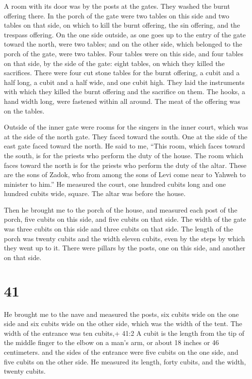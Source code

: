  A room with its door was by the posts at the gates. They
washed the burnt offering there.  In the porch of the gate
were two tables on this side and two tables on that side, on which to
kill the burnt offering, the sin offering, and the trespass offering.
 On the one side outside, as one goes up to the entry of
the gate toward the north, were two tables; and on the other side, which
belonged to the porch of the gate, were two tables.  Four
tables were on this side, and four tables on that side, by the side of
the gate: eight tables, on which they killed the sacrifices.
 There were four cut stone tables for the burnt offering, a
cubit and a half long, a cubit and a half wide, and one cubit high. They
laid the instruments with which they killed the burnt offering and the
sacrifice on them.  The hooks, a hand width long, were
fastened within all around. The meat of the offering was on the tables.

 Outside of the inner gate were rooms for the singers in
the inner court, which was at the side of the north gate. They faced
toward the south. One at the side of the east gate faced toward the
north.  He said to me, ``This room, which faces toward the
south, is for the priests who perform the duty of the house.
 The room which faces toward the north is for the priests
who perform the duty of the altar. These are the sons of Zadok, who from
among the sons of Levi come near to Yahweh to minister to him.''
 He measured the court, one hundred cubits long and one
hundred cubits wide, square. The altar was before the house.

 Then he brought me to the porch of the house, and measured
each post of the porch, five cubits on this side, and five cubits on
that side. The width of the gate was three cubits on this side and three
cubits on that side.  The length of the porch was twenty
cubits and the width eleven cubits, even by the steps by which they went
up to it. There were pillars by the posts, one on this side, and another
on that side.

\hypertarget{section-39}{%
\section{41}\label{section-39}}

 He brought me to the nave and measured the posts, six
cubits wide on the one side and six cubits wide on the other side, which
was the width of the tent.  The width of the entrance was
ten cubits,+ 41:2 A cubit is the length from the tip of the middle
finger to the elbow on a man's arm, or about 18 inches or 46
centimeters. and the sides of the entrance were five cubits on the one
side, and five cubits on the other side. He measured its length, forty
cubits, and the width, twenty cubits.

